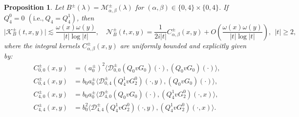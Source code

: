 \documentclass[reqno]{amsart}
\newtheorem{proposition}[theorem]{Proposition}
\numberwithin{equation}{section}
\begin{document}
\begin{proposition}\label{prop_second_critical_block}  
	Let $B^\pm(\lambda) = \mathcal{M}_{\alpha,\beta}^{\pm}(\lambda)$ for $(\alpha,\beta) \in \{0,4\} \times \{0,4\}$. If $Q_4^0 = 0$ $(\text{i.e.,}\  Q_4=Q_4^1 )$, then  
	\[  
\bigl|\mathcal{K}_{B}^\pm(t,x,y)\bigr| \lesssim \frac{\omega(x)\omega(y)}{|t|\log|t|}, \quad  
\mathcal{N}_{B}^\pm(t,x,y) = \frac{1}{2 i |t|} C^\pm_{\alpha,\beta}(x,y) + {O}\!\left(\frac{\omega(x)\omega(y)}{|t|\log|t|}\right),  \ \ |t| \ge 2,
	\]  
    where the integral kernels $C^\pm_{\alpha,\beta}(x,y)$ 
	are uniformly bounded and explicitly given by:    
	\begin{equation*}  
		\begin{split}
		C^\pm_{0,0}(x,y) &= (a_0^\pm)^2\bigl\langle  \mathcal{D}_{0,0}^{\pm}(Q_0v G_0)(\cdot), (Q_0v G_0)(\cdot) \bigr\rangle,\\
        C^\pm_{0,4}(x,y) &= b_0a_0^\pm \bigl\langle  \mathcal{D}_{0,4}^{\pm} (Q_{4}^1 v G_2^0)(\cdot,y), (Q_0v G_0)(\cdot) \bigr\rangle, \\  
		C^\pm_{4,0}(x,y) &= b_0a_0^\pm \bigl\langle  \mathcal{D}_{4,0}^{\pm}(Q_0v G_0)(\cdot), (Q_{4}^1 v G_2^0)(\cdot,x) \bigr\rangle,\\
		C^\pm_{4,4}(x,y)&= b_0^2 \bigl\langle \mathcal{D}_{4,4}^{\pm} (Q_{4}^1 v G_2^0)(\cdot,y), (Q_{4}^1 v G_2^0)(\cdot,x) \bigr\rangle.  
		\end{split}
	\end{equation*}  
\end{proposition} 
\end{document}
